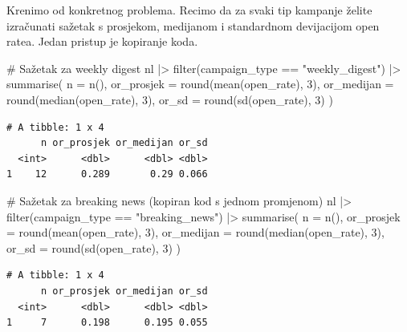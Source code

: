 \documentclass[
  croatian,
  letterpaper,
  DIV=11,
  numbers=noendperiod]{scrartcl}
\newenvironment{Shaded}{\begin{snugshade}}{\end{snugshade}}
\newcommand{\AttributeTok}[1]{\textcolor[rgb]{0.40,0.45,0.13}{#1}}
\newcommand{\CommentTok}[1]{\textcolor[rgb]{0.37,0.37,0.37}{#1}}
\newcommand{\DecValTok}[1]{\textcolor[rgb]{0.68,0.00,0.00}{#1}}
\newcommand{\FunctionTok}[1]{\textcolor[rgb]{0.28,0.35,0.67}{#1}}
\newcommand{\NormalTok}[1]{\textcolor[rgb]{0.00,0.23,0.31}{#1}}
\newcommand{\SpecialCharTok}[1]{\textcolor[rgb]{0.37,0.37,0.37}{#1}}
\newcommand{\StringTok}[1]{\textcolor[rgb]{0.13,0.47,0.30}{#1}}
\begin{document}
Krenimo od konkretnog problema. Recimo da za svaki tip kampanje želite
izračunati sažetak s prosjekom, medijanom i standardnom devijacijom open
ratea. Jedan pristup je kopiranje koda.

\begin{Shaded}
\begin{Highlighting}[]
\CommentTok{\# Sažetak za weekly digest}
\NormalTok{nl }\SpecialCharTok{|\textgreater{}}
  \FunctionTok{filter}\NormalTok{(campaign\_type }\SpecialCharTok{==} \StringTok{"weekly\_digest"}\NormalTok{) }\SpecialCharTok{|\textgreater{}}
  \FunctionTok{summarise}\NormalTok{(}
    \AttributeTok{n =} \FunctionTok{n}\NormalTok{(),}
    \AttributeTok{or\_prosjek =} \FunctionTok{round}\NormalTok{(}\FunctionTok{mean}\NormalTok{(open\_rate), }\DecValTok{3}\NormalTok{),}
    \AttributeTok{or\_medijan =} \FunctionTok{round}\NormalTok{(}\FunctionTok{median}\NormalTok{(open\_rate), }\DecValTok{3}\NormalTok{),}
    \AttributeTok{or\_sd =} \FunctionTok{round}\NormalTok{(}\FunctionTok{sd}\NormalTok{(open\_rate), }\DecValTok{3}\NormalTok{)}
\NormalTok{  )}
\end{Highlighting}
\end{Shaded}

\begin{verbatim}
# A tibble: 1 x 4
      n or_prosjek or_medijan or_sd
  <int>      <dbl>      <dbl> <dbl>
1    12      0.289       0.29 0.066
\end{verbatim}

\begin{Shaded}
\begin{Highlighting}[]
\CommentTok{\# Sažetak za breaking news (kopiran kod s jednom promjenom)}
\NormalTok{nl }\SpecialCharTok{|\textgreater{}}
  \FunctionTok{filter}\NormalTok{(campaign\_type }\SpecialCharTok{==} \StringTok{"breaking\_news"}\NormalTok{) }\SpecialCharTok{|\textgreater{}}
  \FunctionTok{summarise}\NormalTok{(}
    \AttributeTok{n =} \FunctionTok{n}\NormalTok{(),}
    \AttributeTok{or\_prosjek =} \FunctionTok{round}\NormalTok{(}\FunctionTok{mean}\NormalTok{(open\_rate), }\DecValTok{3}\NormalTok{),}
    \AttributeTok{or\_medijan =} \FunctionTok{round}\NormalTok{(}\FunctionTok{median}\NormalTok{(open\_rate), }\DecValTok{3}\NormalTok{),}
    \AttributeTok{or\_sd =} \FunctionTok{round}\NormalTok{(}\FunctionTok{sd}\NormalTok{(open\_rate), }\DecValTok{3}\NormalTok{)}
\NormalTok{  )}
\end{Highlighting}
\end{Shaded}

\begin{verbatim}
# A tibble: 1 x 4
      n or_prosjek or_medijan or_sd
  <int>      <dbl>      <dbl> <dbl>
1     7      0.198      0.195 0.055
\end{verbatim}
\end{document}
